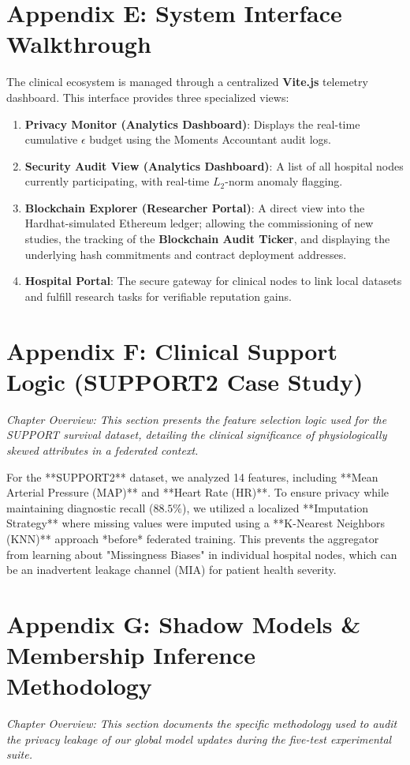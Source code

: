 \documentclass[10pt, a4paper, twocolumn]{article}
\begin{document}
\section*{Appendix E: System Interface Walkthrough}
The clinical ecosystem is managed through a centralized \textbf{Vite.js} telemetry dashboard. This interface provides three specialized views:
\begin{enumerate}
    \item \textbf{Privacy Monitor (Analytics Dashboard)}: Displays the real-time cumulative $\epsilon$ budget using the Moments Accountant audit logs.
    \item \textbf{Security Audit View (Analytics Dashboard)}: A list of all hospital nodes currently participating, with real-time $L_2$-norm anomaly flagging.
    \item \textbf{Blockchain Explorer (Researcher Portal)}: A direct view into the Hardhat-simulated Ethereum ledger; allowing the commissioning of new studies, the tracking of the \textbf{Blockchain Audit Ticker}, and displaying the underlying hash commitments and contract deployment addresses.
    \item \textbf{Hospital Portal}: The secure gateway for clinical nodes to link local datasets and fulfill research tasks for verifiable reputation gains.
\end{enumerate}

\section*{Appendix F: Clinical Support Logic (SUPPORT2 Case Study)}
\textit{Chapter Overview: This section presents the feature selection logic used for the SUPPORT survival dataset, detailing the clinical significance of physiologically skewed attributes in a federated context.}

For the **SUPPORT2** dataset, we analyzed 14 features, including **Mean Arterial Pressure (MAP)** and **Heart Rate (HR)**. To ensure privacy while maintaining diagnostic recall ($88.5\%$), we utilized a localized **Imputation Strategy** where missing values were imputed using a **K-Nearest Neighbors (KNN)** approach *before* federated training. This prevents the aggregator from learning about "Missingness Biases" in individual hospital nodes, which can be an inadvertent leakage channel (MIA) for patient health severity.

\section*{Appendix G: Shadow Models \& Membership Inference Methodology}
\textit{Chapter Overview: This section documents the specific methodology used to audit the privacy leakage of our global model updates during the five-test experimental suite.}
\end{document}
